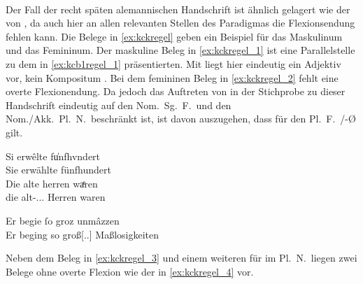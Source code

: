 \paragraph{\citet{kc:K}}
Der Fall der recht späten alemannischen Handschrift \citet{kc:K} ist ähnlich
gelagert wie der von \citet{kc:C1}, da auch hier an allen relevanten Stellen
des Paradigmas die Flexionsendung fehlen kann. Die Belege in \cref{ex:kckregel}
geben ein Beispiel für das Maskulinum und das Femininum. Der maskuline Beleg in
\cref{ex:kckregel_1} ist eine Parallelstelle zu dem in \cref{ex:kcb1regel_1}
präsentierten. Mit   liegt hier eindeutig ein Adjektiv
vor, kein Kompositum  
\autocite[vgl.][\pno~\textit{althêrre}]{mwb1}. Bei dem femininen Beleg in
\cref{ex:kckregel_2} fehlt eine overte Flexionendung.
Da jedoch das Auftreten von  in der Stichprobe zu dieser Handschrift
eindeutig auf den Nom.\ Sg.\ F.\ und den Nom./Akk.\ Pl.\ N.\ beschränkt ist,
ist davon auszugehen, dass für den Pl.~F.\ /-Ø gilt.

\begin{exe}
\ex \label{ex:kckregel}
	\begin{xlist}
	\ex \label{ex:kckregel_1}
		\gll Si erwêlte fu̍nfhvndert \\
			Sie erwählte fünfhundert \\
	\sn \gll Die alte herren waͤren \\
			die alt-\Nom.\Pl.\MascM.\St{} Herren waren \\
		\begin{taggedline}{\parencites[\pno~51\ra, 37]{kc:K}[vgl.][8477]{schroeder1895}}
		\trans {}
		\end{taggedline}

	\ex \label{ex:kckregel_2}
		\gll Er begie ſo groz unmâzzen \\
			Er beging so groß[\Acc.\Pl.\FemI] Maßlosigkeiten \\
		\begin{taggedline}{\parencites[\pno~8\rb, 25]{kc:K}[vgl.][1286]{schroeder1895}}
		\trans {}
		\end{taggedline}
	\end{xlist}
\end{exe}

Neben dem Beleg in \cref{ex:kckregel_3} und einem weiteren für  im
Pl.~N.\ liegen zwei Belege ohne overte Flexion wie der in \cref{ex:kckregel_4}
vor.

